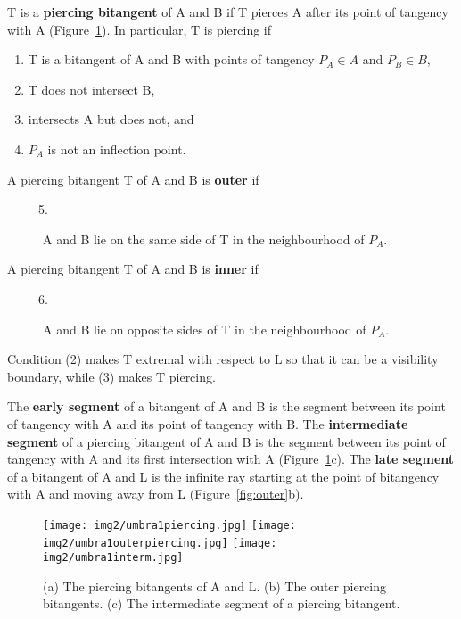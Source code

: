 \documentclass[9pt,twocolumn]{article}
\newif\ifSurrounding    %
\begin{document}
\begin{defn2}
\label{defn:piercing1}
T is a {\bf piercing bitangent} of A and B if 
T pierces A after its point of tangency with A (Figure~\ref{fig:piercing}).
In particular, T is piercing if
\begin{enumerate}
\item T is a bitangent of A and B with points of tangency $P_A \in A$ and $P_B \in B$,
\item T does not intersect B, 
\item {} intersects A but  does not, and
\item $P_A$ is not an inflection point.
\end{enumerate}
A piercing bitangent T of A and B is {\bf outer} if 
\begin{description}
\item[\ \ \ \ \ {\rm 5.}] A and B lie on the same side of T in the neighbourhood of $P_A$.
\end{description}

\noindent A piercing bitangent T of A and B is {\bf inner} if
\begin{description}
\item[\ \ \ \ \ {\rm 6.}] A and B lie on opposite sides of T in the neighbourhood of $P_A$.
\end{description}
\end{defn2}

\noindent 
Condition (2) makes T extremal with respect to L so that it can be a visibility boundary,
while (3) makes T piercing.
\ifSurrounding
Due to the care taken with conditions 3 and 5, 
no adjustment needs to be made for surrounding objects.
\fi

\begin{defn2}
\label{defn:seg}
The {\bf early segment} of a bitangent of A and B is the segment between its point
of tangency with A and its point of tangency with B.
The {\bf intermediate segment} of a piercing bitangent of A and B
is the segment between its point of tangency with A and 
its first intersection with A (Figure~\ref{fig:piercing}c).
The {\bf late segment} of a bitangent of A and L is the infinite ray starting at the
point of bitangency with A and moving away from L (Figure~\ref{fig:outer}b).
\end{defn2}

\begin{figure}
\begin{center}
\texttt{[image: img2/umbra1piercing.jpg]}
\texttt{[image: img2/umbra1outerpiercing.jpg]}
\texttt{[image: img2/umbra1interm.jpg]}
\end{center}
\caption{(a) The piercing bitangents of A and L.
         (b) The outer piercing bitangents. 
         (c) The intermediate segment of a piercing bitangent.}
\label{fig:piercing}
\end{figure}
\end{document}
